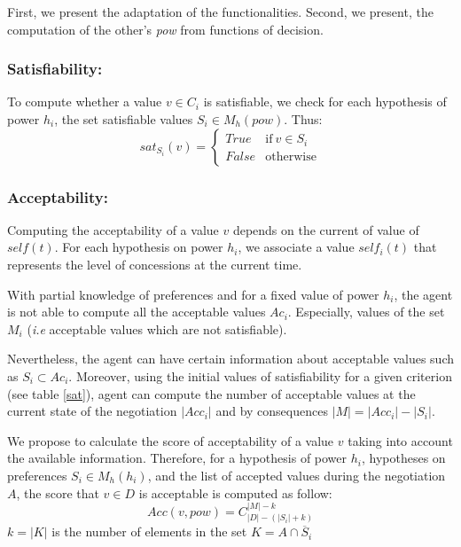 \documentclass[sigconf]{aamas}  %
\begin{document}
	First, we present the adaptation of the functionalities. Second, we present, the computation of the other's \emph{pow} from functions of decision.   
	
	\subsubsection{Satisfiability:}
	To compute whether a value $v \in C_i$ is satisfiable, we check for each hypothesis of power $h_i$, the set satisfiable values $S_i \in M_h(pow)$.
	Thus: 
	\begin{equation}
	sat_{S_i}(v)= \left\{\begin{array}{ll}
	True	 & \mathrm{if\ }  v \in S_i\\
	False & \mathrm{otherwise}
	\end{array}\right.
	\end{equation}
	
	\subsubsection{Acceptability:}
	Computing the acceptability of a value $v$ depends on the current of value of $self(t)$. For each hypothesis on power $h_i$, we associate a value $self_i(t)$ that represents the level of concessions at the current time. 
	
	With partial knowledge of preferences and for a fixed value of power $h_i$, the agent is not able to compute all the acceptable values $Ac_i$. Especially,   values of the set $M_i$ (\emph{i.e} acceptable values which are not satisfiable). 
	
	Nevertheless, the agent can have certain information about acceptable values such as $ S_i \subset Ac_i$. Moreover, using the initial values of satisfiability for a given criterion (see table \ref{sat}), agent can compute the number of acceptable values at the current state of the negotiation $|Acc_i|$ and by consequences $|M| = |Acc_i| - |S_i|$. 
	
	We propose to calculate the score of acceptability of a value $v$ taking into account the available information. Therefore, for a hypothesis of power $h_i$, hypotheses on preferences $S_i \in M_h(h_i)$,  and the list of accepted values during the negotiation $A$, the score that $v \in D$ is acceptable is computed as follow: 
	\begin{equation}
	Acc(v, pow) = C_{|D|-(|S_i| + k)}^{|M| - k}
	\end{equation}
	$k = |K| $ is the number of elements in the set $K = A \cap \overline S_i$
	
\end{document}

